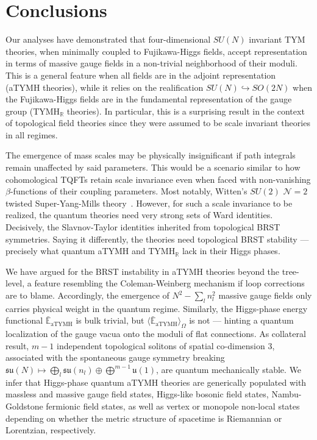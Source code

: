 \documentclass[../main.tex]{subfiles}
\begin{document}
\section{Conclusions}%
\label{sec:conclusions}

Our analyses have demonstrated that four-dimensional $SU(N)$ invariant TYM theories, when minimally coupled to Fujikawa-Higgs fields, accept representation in terms of massive gauge fields in a non-trivial neighborhood of their moduli. This is a general feature when all fields are in the adjoint representation (aTYMH theories), while it relies on the realification $SU(N) \hookrightarrow SO(2N)$ when the Fujikawa-Higgs fields are in the fundamental representation of the gauge group (TYMH$_{\mathbb{R}}$ theories). In particular, this is a surprising result in the context of topological field theories since they were assumed to be scale invariant theories in all regimes.

The emergence of mass scales may be physically insignificant if path integrals remain unaffected by said parameters. This would be a scenario similar to how cohomological TQFTs retain scale invariance even when faced with non-vanishing $\beta$-functions of their coupling parameters. Most notably, Witten's $SU(2)$ $\mathcal{N}=2$ twisted Super-Yang-Mills theory~\cite{witten1988d,brooks1988a}. However, for such a scale invariance to be realized, the quantum theories need very strong sets of Ward identities. Decisively, the Slavnov-Taylor identities inherited from topological BRST symmetries. Saying it differently, the theories need topological BRST stability --- precisely what quantum aTYMH and TYMH$_{\mathbb{R}}$ lack in their Higgs phases.

We have argued for the BRST instability in aTYMH theories beyond the tree-level, a feature resembling the Coleman-Weinberg mechanism if loop corrections are to blame. Accordingly, the emergence of  $N^2 - \sum_l n_l^2$ massive gauge fields only carries physical weight in the quantum regime. Similarly, the Higgs-phase energy functional $\bar{\mathbb{E}}_{\text{aTYMH}}$ is bulk trivial, but $\langle \bar{\mathbb{E}}_{\text{aTYMH}} \rangle_{\Omega}$ is not --- hinting a quantum localization of the gauge vacua onto the moduli of flat connections. As collateral result, $m-1$ independent topological solitons of spatial co-dimension 3, associated with the spontaneous gauge symmetry breaking $\mathfrak{su}(N) \mapsto \bigoplus_l \mathfrak{su}(n_l) \oplus \bigoplus^{m-1} \mathfrak{u}(1)$, are quantum mechanically stable. We infer that Higgs-phase quantum aTYMH theories are generically populated with massless and massive gauge field states, Higgs-like bosonic field states, Nambu-Goldstone fermionic field states, as well as vertex or monopole non-local states depending on whether the metric structure of spacetime is Riemannian or Lorentzian, respectively.
\end{document}
